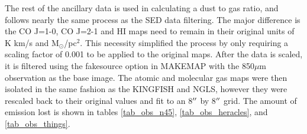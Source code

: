 The rest of the ancillary data is used in calculating a dust to gas ratio, and follows nearly the same process as the SED data filtering.  The major difference is the CO J=1-0, CO J=2-1 and HI maps need to remain in their original units of K km/s and M$_\odot$/pc$^2$.  This necessity simplified the process by only requiring a scaling factor of 0.001 to be applied to the original maps.  After the data is scaled, it is filtered using the fakesource option in MAKEMAP with the 850$\mu$m observation as the base image.  The atomic and molecular gas maps were then isolated in the same fashion as the KINGFISH and NGLS, however they were rescaled back to their original values and fit to an 8$\mbox{$^{\prime\prime}$}$ by 8$\mbox{$^{\prime\prime}$}$ grid.  The amount of emission lost is shown in tables \ref{tab_obs_n45}, \ref{tab_obs_heracles}, and \ref{tab_obs_things}.
